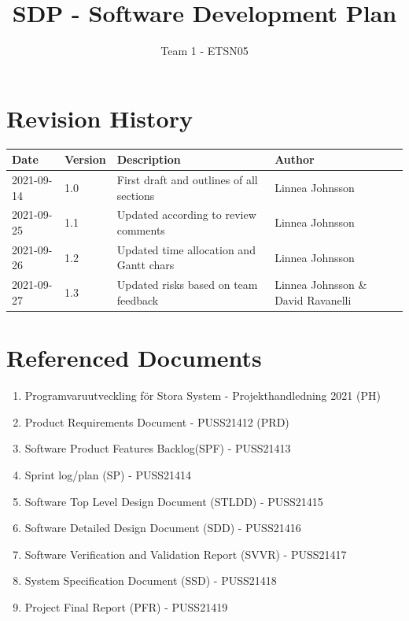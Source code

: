 \documentclass{article}
\title{SDP - Software Development Plan}
\author{Team 1 - ETSN05}
\begin{document}
\date{}
\maketitle
\thispagestyle{fancy}
\newpage

\section*{Revision History}
\begin{table}[h]
    \centering
    \begin{tabular}{|l|l|p{55mm}|p{35mm}|}
    \hline
    Date & Version & Description & Author \\ 
    \hline\hline 
    2021-09-14 & 1.0 & First draft and outlines of all sections & Linnea Johnsson \\
    \hline
    2021-09-25 & 1.1 & Updated according to review comments & Linnea Johnsson \\ 
    \hline
    2021-09-26 & 1.2 & Updated time allocation and Gantt chars & Linnea Johnsson  \\ 
    \hline
    2021-09-27 & 1.3 & Updated risks based on team feedback & Linnea Johnsson \& David Ravanelli \\ 
    \hline
    \end{tabular}
    \label{tab:history}
\end{table}
\newpage
 
\section*{Referenced Documents}\label{refdoc}
\begin{enumerate}
    \item Programvaruutveckling för Stora System - Projekthandledning 2021 (PH)
    \item Product Requirements Document - PUSS21412 (PRD)
    \item Software Product Features Backlog(SPF) - PUSS21413
    \item Sprint log/plan (SP) - PUSS21414
    \item Software Top Level Design Document (STLDD) - PUSS21415
    \item Software Detailed Design Document (SDD) - PUSS21416
    \item Software Verification and Validation Report (SVVR) - PUSS21417
    \item System Specification Document (SSD) - PUSS21418
    \item Project Final Report (PFR) - PUSS21419

\end{enumerate}
\newpage
\end{document}
